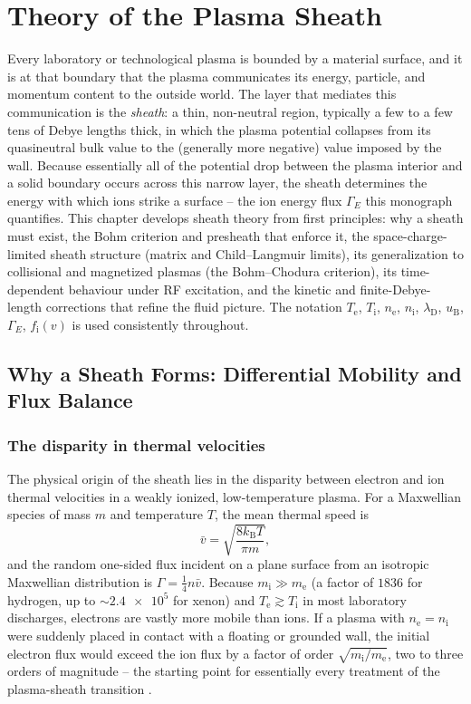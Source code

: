 \chapter{Theory of the Plasma Sheath}
\label{ch:sheath}

Every laboratory or technological plasma is bounded by a material surface, and it is at that boundary that the plasma communicates its energy, particle, and momentum content to the outside world. The layer that mediates this communication is the \emph{sheath}: a thin, non-neutral region, typically a few to a few tens of Debye lengths thick, in which the plasma potential collapses from its quasineutral bulk value to the (generally more negative) value imposed by the wall. Because essentially all of the potential drop between the plasma interior and a solid boundary occurs across this narrow layer, the sheath determines the energy with which ions strike a surface -- the ion energy flux $\Gamma_{E}$ this monograph quantifies. This chapter develops sheath theory from first principles: why a sheath must exist, the Bohm criterion and presheath that enforce it, the space-charge-limited sheath structure (matrix and Child--Langmuir limits), its generalization to collisional and magnetized plasmas (the Bohm--Chodura criterion), its time-dependent behaviour under RF excitation, and the kinetic and finite-Debye-length corrections that refine the fluid picture. The notation $T_{\mathrm{e}}$, $T_{\mathrm{i}}$, $n_{\mathrm{e}}$, $n_{\mathrm{i}}$, $\lambda_{\mathrm{D}}$, $u_{\mathrm{B}}$, $\Gamma_{E}$, $f_{\mathrm{i}}(v)$ is used consistently throughout.

\section{Why a Sheath Forms: Differential Mobility and Flux Balance}

\subsection{The disparity in thermal velocities}

The physical origin of the sheath lies in the disparity between electron and ion thermal velocities in a weakly ionized, low-temperature plasma. For a Maxwellian species of mass $m$ and temperature $T$, the mean thermal speed is
\begin{equation}
\bar{v} = \sqrt{\frac{8 k_{\mathrm{B}} T}{\pi m}},
\end{equation}
and the random one-sided flux incident on a plane surface from an isotropic Maxwellian distribution is $\Gamma = \tfrac{1}{4} n \bar{v}$. Because $m_{\mathrm{i}} \gg m_{\mathrm{e}}$ (a factor of $\num{1836}$ for hydrogen, up to $\sim \num{2.4e5}$ for xenon) and $T_{\mathrm{e}} \gtrsim T_{\mathrm{i}}$ in most laboratory discharges, electrons are vastly more mobile than ions. If a plasma with $n_{\mathrm{e}} = n_{\mathrm{i}}$ were suddenly placed in contact with a floating or grounded wall, the initial electron flux would exceed the ion flux by a factor of order $\sqrt{m_{\mathrm{i}}/m_{\mathrm{e}}}$, two to three orders of magnitude -- the starting point for essentially every treatment of the plasma-sheath transition \cite{ref0013,ref0015}.

